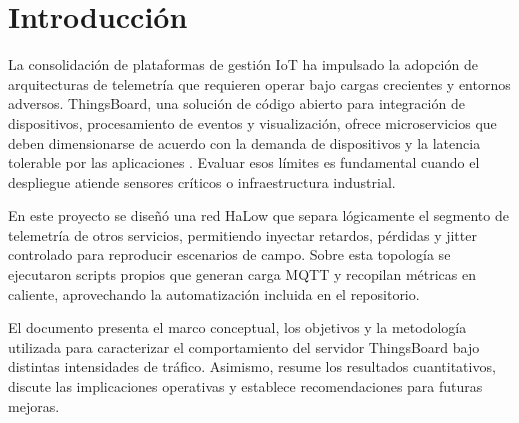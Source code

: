 \section{Introducci\'on}
La consolidaci\'on de plataformas de gesti\'on IoT ha impulsado la adopci\'on de arquitecturas de telemetr\'ia que requieren operar bajo cargas crecientes y entornos adversos. ThingsBoard, una soluci\'on de c\'odigo abierto para integraci\'on de dispositivos, procesamiento de eventos y visualizaci\'on, ofrece microservicios que deben dimensionarse de acuerdo con la demanda de dispositivos y la latencia tolerable por las aplicaciones \cite{thingsboard-docs}. Evaluar esos l\'imites es fundamental cuando el despliegue atiende sensores cr\'iticos o infraestructura industrial.

En este proyecto se dise\~n\'o una red HaLow que separa l\'ogicamente el segmento de telemetr\'ia de otros servicios, permitiendo inyectar retardos, p\'erdidas y jitter controlado para reproducir escenarios de campo. Sobre esta topolog\'ia se ejecutaron scripts propios que generan carga MQTT y recopilan m\'etricas en caliente, aprovechando la automatizaci\'on incluida en el repositorio.

El documento presenta el marco conceptual, los objetivos y la metodolog\'ia utilizada para caracterizar el comportamiento del servidor ThingsBoard bajo distintas intensidades de tr\'afico. Asimismo, resume los resultados cuantitativos, discute las implicaciones operativas y establece recomendaciones para futuras mejoras.
